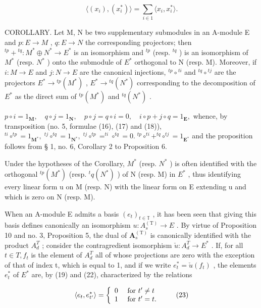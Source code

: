 \[
\langle (x _ {i}), (x _ {i} ^ {*}) \rangle = \sum_ {i \in 1} \langle x _ {i}, x _ {i} ^ {*} \rangle .\tag{22}
\]

COROLLARY. Let M, N be two supplementary submodules in an A-module E and \(p:E\to M\) , \(q:E\to N\) the corresponding projectors; then \({}^{tp}+{}^{tq}:M^{*}\oplus N^{*}\to E^{*}\) is an isomorphism and \({}^{tp}\) (resp. \({}^{tq}\) ) is an isomorphism of \(M^{*}\) (resp. \(N^{*}\) ) onto the submodule of \(E^{*}\) orthogonal to N (resp. M). Moreover, if \(i:M\to E\) and \(j:N\to E\) are the canonical injections, \({}^{tp}\circ{}^{ti}\) and \({}^{tq}\circ{}^{tj}\) are the projectors \(E^{*}\to{}^{tp}(M^{*})\) , \(E^{*}\to{}^{tq}(N^{*})\) corresponding to the decomposition of \(E^{*}\) as the direct sum of \({}^{tp}(M^{*})\) and \({}^{tq}(N^{*})\) .

\(p \circ i = 1_{\mathbf{M}}, \quad q \circ j = 1_{\mathbf{N}}, \quad p \circ j = q \circ i = 0, \quad i \circ p + j \circ q = 1_{\mathbf{E}},\) whence, by transposition (no. 5, formulae (16), (17) and (18)), \(^{ti} \circ ^{tp} = 1_{\mathbf{M}^*}, \; ^{tj} \circ ^{tq} = 1_{\mathbf{N}^*}, \; ^{tj} \circ ^{tp} = ^{ti} \circ ^{tq} = 0. \; ^{tp} \circ ^{ti} + ^{tq} \circ ^{tj} = 1_{\mathbf{E}^*}\) and the proposition follows from § 1, no. 6, Corollary 2 to Proposition 6.

Under the hypotheses of the Corollary, \(M^{*}\) (resp. \(N^{*}\) ) is often identified with the orthogonal \(^{tp}(M^{*})\) (resp. \(^{t}q(N^{*})\) ) of N (resp. M) in \(E^{*}\) , thus identifying every linear form u on M (resp. N) with the linear form on E extending u and which is zero on N (resp. M).

When an A-module E admits a basis \((e_{t})_{t\in\mathbb{T}}\) , it has been seen that giving this basis defines canonically an isomorphism \(u:A_{s}^{\mathrm{(T)}}\to E\) . By virtue of Proposition 10 and no. 3, Proposition 5, the dual of \(\mathbf{A}_{s}^{\mathrm{(T)}}\) is canonically identified with the product \(A_{d}^{T}\) ; consider the contragredient isomorphism \(\check{u}:A_{d}^{T}\to E^{*}\) . If, for all \(t\in T,f_{t}\) is the element of \(A_{d}^{T}\) all of whose projections are zero with the exception of that of index t, which is equal to 1, and if we write \(e_{t}^{*}=\check{u}(f_{t})\) , the elements \(e_{t}^{*}\) of \(E^{*}\) are, by (19) and (22), characterized by the relations

\[
\langle e _ {t}, e _ {t ^ {\prime}} ^ {*} \rangle = \left\{ \begin{array}{l l} 0 & \text { for } t ^ {\prime} \neq t \\ 1 & \text { for } t ^ {\prime} = t. \end{array} \right.\tag{23}
\]

